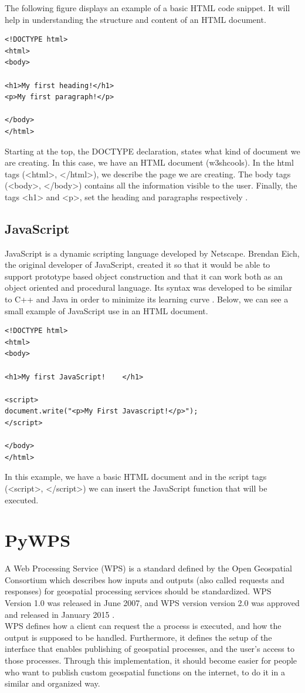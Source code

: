 The following figure displays an example of a basic HTML code snippet. It will help in understanding the structure and content of an HTML document.

\begin{lstlisting}
<!DOCTYPE html>
<html>
<body>

<h1>My first heading!</h1>
<p>My first paragraph!</p>

</body>
</html>
\end{lstlisting}

Starting at the top, the DOCTYPE declaration, states what kind of document we are creating. In this case, we have an HTML document (w3shcools). In the html tags (<html>, </html>), we describe the page we are creating. The body tags (<body>, </body>) contains all the information visible to the user. Finally, the tags <h1> and <p>, set the heading and paragraphs respectively \citep{w3schools}.

\subsection{JavaScript}
JavaScript is a dynamic scripting language developed by Netscape. Brendan Eich, the original developer of JavaScript, created it so that it would be able to support prototype based object construction and  that it can work both as an object oriented and procedural language. Its syntax was developed to be similar to C++ and Java in order to minimize its learning curve \citep{mozjava}. Below, we can see a small example of JavaScript use in an HTML document.	

\begin{lstlisting}
<!DOCTYPE html>
<html>
<body>

<h1>My first JavaScript!	</h1>

<script>
document.write("<p>My First Javascript!</p>");
</script>

</body>
</html>
\end{lstlisting}

In this example, we have a basic HTML document and in the script tags (<script>, </script>) we can insert the JavaScript function that will be executed.

\section{PyWPS}

A Web Processing Service (WPS) is a standard defined by the Open Geospatial Consortium which describes how inputs and outputs (also called requests and responses) for geospatial processing services should be standardized. 
WPS Version 1.0 was released in June 2007, and WPS version version 2.0 was approved and released in January 2015 \citep{ogcwps}. \\
WPS defines how a client can request the a process is executed, and how the output is supposed to be handled. Furthermore, it defines the setup of the interface that enables publishing of geospatial processes, and the user's access to those processes. Through this implementation, it should become easier for people who want to publish custom geospatial functions on the internet, to do it in a similar and organized way. \\

